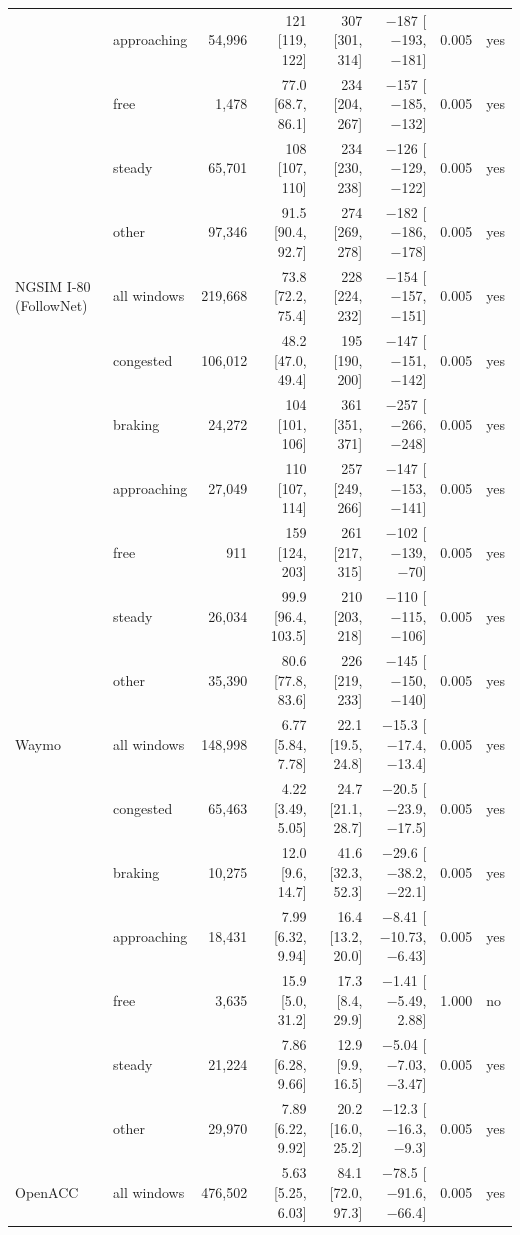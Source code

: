 \begin{longtable}{llrrrrrl}
 & approaching & 54,996 & 121 [119, 122] & 307 [301, 314] & $-$187 [$-$193, $-$181] & 0.005 & yes \\
 & free & 1,478 & 77.0 [68.7, 86.1] & 234 [204, 267] & $-$157 [$-$185, $-$132] & 0.005 & yes \\
 & steady & 65,701 & 108 [107, 110] & 234 [230, 238] & $-$126 [$-$129, $-$122] & 0.005 & yes \\
 & other & 97,346 & 91.5 [90.4, 92.7] & 274 [269, 278] & $-$182 [$-$186, $-$178] & 0.005 & yes \\
\midrule
NGSIM I-80 (FollowNet) & all windows & 219,668 & 73.8 [72.2, 75.4] & 228 [224, 232] & $-$154 [$-$157, $-$151] & 0.005 & yes \\
 & congested & 106,012 & 48.2 [47.0, 49.4] & 195 [190, 200] & $-$147 [$-$151, $-$142] & 0.005 & yes \\
 & braking & 24,272 & 104 [101, 106] & 361 [351, 371] & $-$257 [$-$266, $-$248] & 0.005 & yes \\
 & approaching & 27,049 & 110 [107, 114] & 257 [249, 266] & $-$147 [$-$153, $-$141] & 0.005 & yes \\
 & free & 911 & 159 [124, 203] & 261 [217, 315] & $-$102 [$-$139, $-$70] & 0.005 & yes \\
 & steady & 26,034 & 99.9 [96.4, 103.5] & 210 [203, 218] & $-$110 [$-$115, $-$106] & 0.005 & yes \\
 & other & 35,390 & 80.6 [77.8, 83.6] & 226 [219, 233] & $-$145 [$-$150, $-$140] & 0.005 & yes \\
\midrule
Waymo & all windows & 148,998 & 6.77 [5.84, 7.78] & 22.1 [19.5, 24.8] & $-$15.3 [$-$17.4, $-$13.4] & 0.005 & yes \\
 & congested & 65,463 & 4.22 [3.49, 5.05] & 24.7 [21.1, 28.7] & $-$20.5 [$-$23.9, $-$17.5] & 0.005 & yes \\
 & braking & 10,275 & 12.0 [9.6, 14.7] & 41.6 [32.3, 52.3] & $-$29.6 [$-$38.2, $-$22.1] & 0.005 & yes \\
 & approaching & 18,431 & 7.99 [6.32, 9.94] & 16.4 [13.2, 20.0] & $-$8.41 [$-$10.73, $-$6.43] & 0.005 & yes \\
 & free & 3,635 & 15.9 [5.0, 31.2] & 17.3 [8.4, 29.9] & $-$1.41 [$-$5.49, 2.88] & 1.000 & no \\
 & steady & 21,224 & 7.86 [6.28, 9.66] & 12.9 [9.9, 16.5] & $-$5.04 [$-$7.03, $-$3.47] & 0.005 & yes \\
 & other & 29,970 & 7.89 [6.22, 9.92] & 20.2 [16.0, 25.2] & $-$12.3 [$-$16.3, $-$9.3] & 0.005 & yes \\
\midrule
OpenACC & all windows & 476,502 & 5.63 [5.25, 6.03] & 84.1 [72.0, 97.3] & $-$78.5 [$-$91.6, $-$66.4] & 0.005 & yes \\

\end{longtable}

